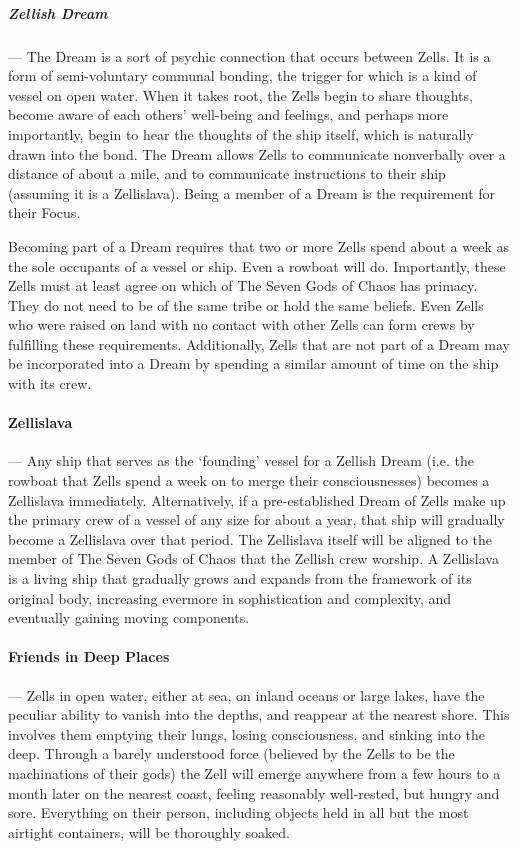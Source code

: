 \documentclass[oneside,11pt,english]{book}
\begin{document}
\subparagraph{Zellish Dream}---\quad
The Dream is a sort of psychic connection that occurs between Zells. It is a form of semi-voluntary communal bonding, the trigger for which is a kind of vessel on open water. When it takes root, the Zells begin to share thoughts, become aware of each others' well-being and feelings, and perhaps more importantly, begin to hear the thoughts of the ship itself, which is naturally drawn into the bond. The Dream allows Zells to communicate nonverbally over a distance of about a mile, and to communicate instructions to their ship (assuming it is a Zellislava). Being a member of a Dream is the requirement for their Focus.


Becoming part of a Dream requires that two or more Zells spend about a week as the sole occupants of a vessel or ship. Even a rowboat will do. Importantly, these Zells must at least agree on which of The Seven Gods of Chaos has primacy. They do not need to be of the same tribe or hold the same beliefs. Even Zells who were raised on land with no contact with other Zells can form crews by fulfilling these requirements. Additionally, Zells that are not part of a Dream may be incorporated into a Dream by spending a similar amount of time on the ship with its crew.


\paragraph{Zellislava}---\quad
Any ship that serves as the ‘founding’ vessel for a Zellish Dream (i.e. the rowboat that Zells spend a week on to merge their consciousnesses) becomes a Zellislava immediately.
Alternatively, if a pre-established Dream of Zells make up the primary crew of a vessel of any size for about a year, that ship will gradually become a Zellislava over that period. The Zellislava itself will be aligned to the member of The Seven Gods of Chaos that the Zellish crew worship. A Zellislava is a living ship that gradually grows and expands from the framework of its original body, increasing evermore in sophistication and complexity, and eventually gaining moving components.

\paragraph{Friends in Deep Places}---\quad
Zells in open water, either at sea, on inland oceans or large lakes, have the peculiar ability to 
vanish into the depths, and reappear at the nearest shore. This involves them emptying their lungs, 
losing consciousness, and sinking into the deep. Through a barely understood force (believed by 
the Zells to be the machinations of their gods) the Zell will emerge anywhere from a few hours to 
a month later on the nearest coast, feeling reasonably well-rested, but hungry and sore. 
Everything on their person, including objects held in all but the most airtight containers, will be thoroughly soaked. 
\end{document}
